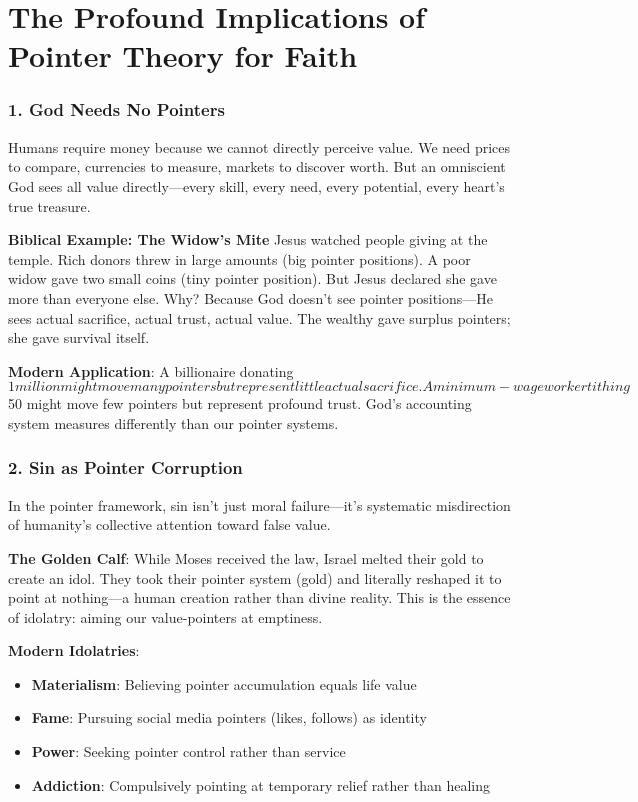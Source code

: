 \documentclass[11pt,oneside]{book}
\begin{document}
{{{{{{\section{The Profound Implications of Pointer Theory for Faith}

\subsubsection{1. God Needs No Pointers}

Humans require money because we cannot directly perceive value. We need prices to compare, currencies to measure, markets to discover worth. But an omniscient God sees all value directly—every skill, every need, every potential, every heart's true treasure.

\textbf{Biblical Example: The Widow's Mite}
Jesus watched people giving at the temple. Rich donors threw in large amounts (big pointer positions). A poor widow gave two small coins (tiny pointer position). But Jesus declared she gave more than everyone else. Why? Because God doesn't see pointer positions—He sees actual sacrifice, actual trust, actual value. The wealthy gave surplus pointers; she gave survival itself.

\textbf{Modern Application}: A billionaire donating $1 million might move many pointers but represent little actual sacrifice. A minimum-wage worker tithing $50 might move few pointers but represent profound trust. God's accounting system measures differently than our pointer systems.

\subsubsection{2. Sin as Pointer Corruption}

In the pointer framework, sin isn't just moral failure—it's systematic misdirection of humanity's collective attention toward false value.

\textbf{The Golden Calf}: While Moses received the law, Israel melted their gold to create an idol. They took their pointer system (gold) and literally reshaped it to point at nothing—a human creation rather than divine reality. This is the essence of idolatry: aiming our value-pointers at emptiness.

\textbf{Modern Idolatries}:
\begin{itemize}
\item \textbf{Materialism}: Believing pointer accumulation equals life value
\item \textbf{Fame}: Pursuing social media pointers (likes, follows) as identity
\item \textbf{Power}: Seeking pointer control rather than service
\item \textbf{Addiction}: Compulsively pointing at temporary relief rather than healing
\end{itemize}

}}}}}}
\end{document}

